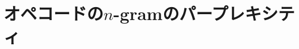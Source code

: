 \documentclass[12pt,twoside]{jreport}
\begin{document}
\section{オペコードの$n$-gramのパープレキシティ}

\begin{table}[t]
  \centering

\end{table}
\end{document}

